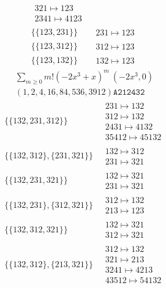 \begin{scriptsize}
\begin{align}
\begin{matrix}
321 \mapsto 123\\2341 \mapsto 4123
\end{matrix}
\\
\{\{123, 231\}\}
\ 
&
\begin{matrix}
231 \mapsto 123
\end{matrix}
\\
\{\{123, 312\}\}
\ 
&
\begin{matrix}
312 \mapsto 123
\end{matrix}
\\
\{\{123, 132\}\}
\ 
&
\begin{matrix}
132 \mapsto 123
\end{matrix}
\end{align}
$$
\begin{matrix}
\sum_{m \geq 0} m! \left(
-2 x^{3} + x
\right)^m
\ 
\left(-2 x^{3}, 0\right)
\\
\left(1, 2, 4, 16, 84, 536, 3912\right)
\texttt{A212432}
\end{matrix}
$$
\begin{align}
\{\{132, 231, 312\}\}
\ 
&
\begin{matrix}
231 \mapsto 132\\312 \mapsto 132\\2431 \mapsto 4132\\35412 \mapsto 45132
\end{matrix}
\\
\{\{132, 312\}, \{231, 321\}\}
\ 
&
\begin{matrix}
132 \mapsto 312\\231 \mapsto 321
\end{matrix}
\\
\{\{132, 231, 321\}\}
\ 
&
\begin{matrix}
132 \mapsto 321\\231 \mapsto 321
\end{matrix}
\\
\{\{132, 231\}, \{312, 321\}\}
\ 
&
\begin{matrix}
312 \mapsto 132\\213 \mapsto 123
\end{matrix}
\\
\{\{132, 312, 321\}\}
\ 
&
\begin{matrix}
132 \mapsto 321\\312 \mapsto 321
\end{matrix}
\\
\{\{132, 312\}, \{213, 321\}\}
\ 
&
\begin{matrix}
312 \mapsto 132\\321 \mapsto 213\\3241 \mapsto 4213\\43512 \mapsto 54132

\end{matrix}
\end{align}
\end{scriptsize}
